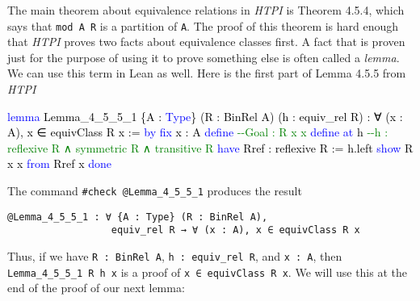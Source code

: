 \documentclass[
  letterpaper,
  DIV=11,
  numbers=noendperiod]{scrreprt}
\newenvironment{Shaded}{\begin{snugshade}}{\end{snugshade}}
\newcommand{\CommentTok}[1]{\textcolor[rgb]{0.37,0.37,0.37}{#1}}
\newcommand{\KeywordTok}[1]{\textcolor[rgb]{0.00,0.23,0.31}{#1}}
\newcommand{\NormalTok}[1]{\textcolor[rgb]{0.00,0.23,0.31}{#1}}
\renewcommand{\NormalTok}[1]{\textcolor[HTML]{000000}{#1}}
\renewcommand{\KeywordTok}[1]{\textcolor[HTML]{0000FF}{#1}}
\renewcommand{\CommentTok}[1]{\textcolor[HTML]{008000}{#1}}
\newenvironment{ind}
	{\begin{list}{}{\setlength{\leftmargin}{1em}}\item\relax}
	{\end{list}}
\theoremstyle{remark}
\begin{document}
The main theorem about equivalence relations in \emph{HTPI} is Theorem
4.5.4, which says that \texttt{mod\ A\ R} is a partition of \texttt{A}.
The proof of this theorem is hard enough that \emph{HTPI} proves two
facts about equivalence classes first. A fact that is proven just for
the purpose of using it to prove something else is often called a
\emph{lemma}. We can use this term in Lean as well. Here is the first
part of Lemma 4.5.5 from \emph{HTPI}

\begin{Shaded}
\begin{Highlighting}[]
\KeywordTok{lemma}\NormalTok{ Lemma\_4\_5\_5\_1 \{A : }\KeywordTok{Type}\NormalTok{\} (R : BinRel A) (h : equiv\_rel R) :}
\NormalTok{    ∀ (x : A), x ∈ equivClass R x := }\KeywordTok{by}
  \KeywordTok{fix}\NormalTok{ x : A}
  \KeywordTok{define}           \CommentTok{{-}{-}Goal : R x x}
  \KeywordTok{define} \KeywordTok{at}\NormalTok{ h      }\CommentTok{{-}{-}h : reflexive R ∧ symmetric R ∧ transitive R}
  \KeywordTok{have}\NormalTok{ Rref : reflexive R := h.left}
  \KeywordTok{show}\NormalTok{ R x x }\KeywordTok{from}\NormalTok{ Rref x}
  \KeywordTok{done}
\end{Highlighting}
\end{Shaded}

The command \texttt{\#check\ @Lemma\_4\_5\_5\_1} produces the result

\begin{ind}

\begin{verbatim}
@Lemma_4_5_5_1 : ∀ {A : Type} (R : BinRel A),
                  equiv_rel R → ∀ (x : A), x ∈ equivClass R x
\end{verbatim}

\end{ind}

Thus, if we have \texttt{R\ :\ BinRel\ A}, \texttt{h\ :\ equiv\_rel\ R},
and \texttt{x\ :\ A}, then \texttt{Lemma\_4\_5\_5\_1\ R\ h\ x} is a
proof of \texttt{x\ ∈\ equivClass\ R\ x}. We will use this at the end of
the proof of our next lemma:
\end{document}
